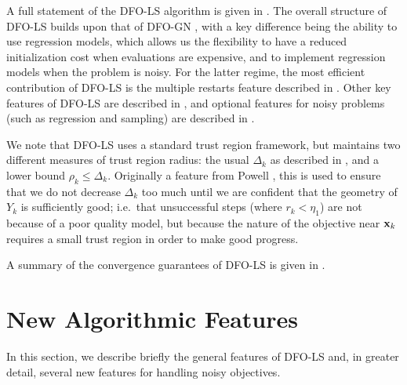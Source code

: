 A full statement of the DFO-LS algorithm is given in . 
The overall structure of DFO-LS builds upon that of DFO-GN \cite{Cartis2017a}, with a key difference being the ability to use regression models, which allows us the flexibility to have a reduced initialization cost when evaluations are expensive, and to implement regression models when the problem is noisy.
For the latter regime, the most efficient contribution of DFO-LS is the multiple restarts feature described in . 
Other key features of DFO-LS are described in , and optional features for noisy problems (such as regression and sampling) are described in .

We note that DFO-LS uses a standard trust region framework, but maintains two different measures of trust region radius: the usual $\Delta_k$ as described in , and a lower bound $\rho_k\leq\Delta_k$.
Originally a feature from Powell \cite{Powell2003}, this is used to ensure that we do not decrease $\Delta_k$ too much until we are confident that the geometry of $Y_k$ is sufficiently good; i.e.~that unsuccessful steps (where $r_k<\eta_1$) are not because of a poor quality model, but because the nature of the objective near $\mathbf{x}_k$ requires a small trust region in order to make good progress.

A summary of the convergence guarantees of DFO-LS is given in .

\section{New Algorithmic Features} \label{sec_implementation}
In this section, we describe  briefly the general features of DFO-LS 
 and, in greater detail, several new features for handling noisy objectives.

